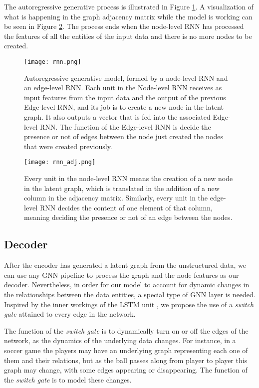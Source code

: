 \documentclass[12pt,a4paper]{article}
\begin{document}
	The autoregressive generative process is illustrated in Figure \ref{rnn1}. A visualization of what is happening in the graph adjacency matrix while the model is working can be seen in Figure \ref{rnn2}. The process ends when the node-level RNN has processed the features of all the entities of the input data and there is no more nodes to be created.
	
	\begin{figure}[hbtp]
		\texttt{[image: rnn.png]}
		\caption{Autoregressive generative model, formed by a node-level RNN and an edge-level RNN. Each unit in the Node-level RNN receives as input features from the input data and the output of the previous Edge-level RNN, and its job is to create a new node in the latent graph. It also outputs a vector that is fed into the associated Edge-level RNN. The function of the Edge-level RNN is decide the presence or not of edges between the node just created the nodes that were created previously. \label{rnn1}}
	\end{figure}
	
	
	\begin{figure}[hbtp]
		\texttt{[image: rnn\_adj.png]}
		\caption{Every unit in the node-level RNN means the creation of a new node in the latent graph, which is translated in the addition of a new column in the adjacency matrix. Similarly, every unit in the edge-level RNN decides the content of one element of that column, meaning deciding the presence or not of an edge between the nodes. \label{rnn2}}
	\end{figure}
	
	
	\subsection{Decoder}
	
	After the encoder has generated a latent graph from the unstructured data, we can use any GNN pipeline to process the graph and the node features as our decoder. Nevertheless, in order for our model to account for dynamic changes in the relationships between the data entities, a special type of GNN layer is needed. Inspired by the inner workings of the LSTM unit \citep{HochreiterandSchmidhuber1997}, we propose the use of a \emph{switch gate} attained to every edge in the network.
	
	The function of the \emph{switch gate} is to dynamically turn on or off the edges of the network, as the dynamics of the underlying data changes. For instance, in a soccer game the players may have an underlying graph representing each one of them and their relations, but as the ball passes along from player to player this graph may change, with some edges appearing or disappearing. The function of the \emph{switch gate} is to model these changes.
	
\end{document}
